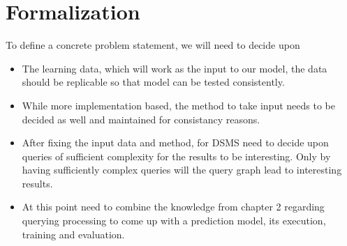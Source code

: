 \section{Formalization}
To define a concrete problem statement, we will need to decide upon
\begin{itemize}
    \item The learning data, which will work as the input to our model, the data should be replicable so that model can be tested consistently.
    \item While more implementation based, the method to take input needs to be decided as well and maintained for consistancy reasons.
    \item After fixing the input data and method, for DSMS need to decide upon queries of sufficient complexity for the results to be interesting. 
    Only by having sufficiently complex queries will the query graph lead to interesting results.
    \item At this point need to combine the knowledge from chapter 2 regarding querying processing to come up with a prediction model, its execution, training and evaluation.
\end{itemize}

% 






